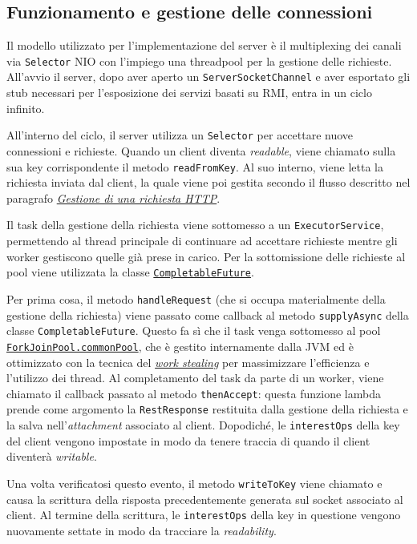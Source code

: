 \documentclass[a4paper,8pt]{article} %
\def\code#1{\texttt{#1}}
\begin{document}
\subsection{Funzionamento e gestione delle connessioni}
Il modello utilizzato per l'implementazione del server è il multiplexing dei canali via \code{Selector} NIO con l'impiego una threadpool per la gestione delle richieste.
All'avvio il server, dopo aver aperto un \code{ServerSocketChannel} e aver esportato gli stub necessari per l'esposizione dei servizi basati su RMI,
entra in un ciclo infinito.
\par All'interno del ciclo, il server utilizza un \code{Selector} per accettare nuove connessioni e richieste.
Quando un client diventa \emph{readable}, viene chiamato sulla sua key corrispondente il metodo \code{readFromKey}. Al suo interno, viene letta la richiesta inviata dal client,
la quale viene poi gestita secondo il flusso descritto nel paragrafo \hyperref[sec:http_flow]{\emph{Gestione di una richiesta HTTP}}.

\par Il task della gestione della richiesta viene sottomesso a un \code{ExecutorService}, permettendo al thread principale di continuare ad accettare richieste mentre gli worker gestiscono quelle già prese in carico.
Per la sottomissione delle richieste al pool viene utilizzata la classe \href{https://docs.oracle.com/javase/8/docs/api/java/util/concurrent/CompletableFuture.html}{\code{CompletableFuture}}.
\par Per prima cosa, il metodo \code{handleRequest} (che si occupa materialmente della gestione della richiesta) viene passato come callback al metodo \code{supplyAsync} della classe \code{CompletableFuture}.
Questo fa sì che il task venga sottomesso al pool \href{https://medium.com/swlh/the-unfairly-unknown-forkjoinpool-c262777def6a}{\code{ForkJoinPool.commonPool}}, che è gestito internamente dalla JVM ed è ottimizzato con la tecnica del \href{https://en.wikipedia.org/wiki/Work_stealing}{\emph{work stealing}} per massimizzare l'efficienza e l'utilizzo dei thread.
Al completamento del task da parte di un worker, viene chiamato il callback passato al metodo \code{thenAccept}: questa funzione lambda prende come argomento la \code{RestResponse} restituita dalla gestione della richiesta e la salva nell'\emph{attachment} associato al client.
Dopodiché, le \code{interestOps} della key del client vengono impostate in modo da tenere traccia di quando il client diventerà \emph{writable}.

\par Una volta verificatosi questo evento, il metodo \code{writeToKey} viene chiamato e causa la scrittura della risposta precedentemente generata sul socket associato al client. Al termine della scrittura, le \code{interestOps} della key in questione
vengono nuovamente settate in modo da tracciare la \emph{readability}.
\end{document}
